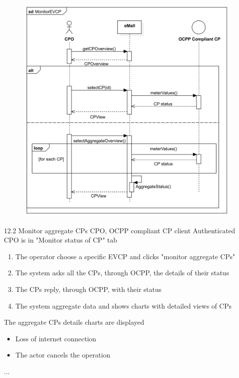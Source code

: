 \usecase
{
    \begin{figure}[H]
        \centering
        \includegraphics[scale=0.9]{src/sequence_diagram/monitorEVCP.png}
    \end{figure}
}
{12.2}
{Monitor aggregate CPs} %
{CPO, OCPP compliant CP client} %
{Authenticated CPO is in "Monitor status of CP" tab} %
{ %
    \begin{enumerate}
        \item The operator choose a specific EVCP and clicks "monitor aggregate CPs"
        \item The system asks all the CPs, through OCPP, the details of their status
        \item The CPs reply, through OCPP, with their status
        \item The system aggregate data and shows charts with detailed views of CPs
    \end{enumerate}
}
{The aggregate CPs details charts are displayed} %
{ %
    \begin{itemize}
        \item Loss of internet connection
        \item The actor cancels the operation
    \end{itemize}
}
{ %
    ...
}

